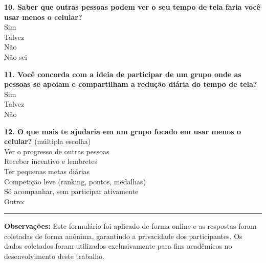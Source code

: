 \begin{questionframe}
\vspace{0.5cm}

\textbf{10. Saber que outras pessoas podem ver o seu tempo de tela faria você usar menos o celular?}\\
\opcao Sim\\
\opcao Talvez\\
\opcao Não\\
\opcao Não sei

\vspace{0.5cm}

\textbf{11. Você concorda com a ideia de participar de um grupo onde as pessoas se apoiam e compartilham a redução diária do tempo de tela?}\\
\opcao Sim\\
\opcao Talvez\\
\opcao Não

\vspace{0.5cm}

\textbf{12. O que mais te ajudaria em um grupo focado em usar menos o celular?} (múltipla escolha)\\
\opcao Ver o progresso de outras pessoas\\
\opcao Receber incentivo e lembretes\\
\opcao Ter pequenas metas diárias\\
\opcao Competição leve (ranking, pontos, medalhas)\\
\opcao Só acompanhar, sem participar ativamente\\
\opcao Outro: \rule{7cm}{0.4pt}

\end{questionframe}

\vspace{1cm}

\textbf{Observações:} Este formulário foi aplicado de forma online e as respostas foram coletadas de forma anônima, garantindo a privacidade dos participantes. Os dados coletados foram utilizados exclusivamente para fins acadêmicos no desenvolvimento deste trabalho.